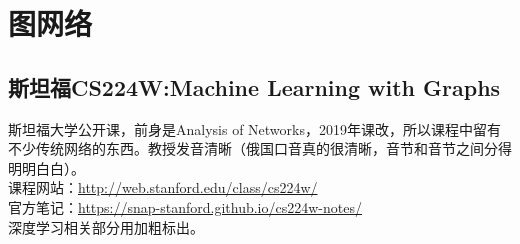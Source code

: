 \documentclass[lang=cn,11pt,a4paper]{eleganttemplate}
\begin{document}
\section{图网络}
\subsection{斯坦福CS224W:Machine Learning with Graphs}
斯坦福大学公开课，前身是Analysis of Networks，2019年课改，所以课程中留有不少传统网络的东西。教授发音清晰（俄国口音真的很清晰，音节和音节之间分得明明白白）。 \\
课程网站：\href{http://web.stanford.edu/class/cs224w/}{http://web.stanford.edu/class/cs224w/} \\
官方笔记：\href{https://snap-stanford.github.io/cs224w-notes/}{https://snap-stanford.github.io/cs224w-notes/} \\
深度学习相关部分用加粗标出。
\end{document}
